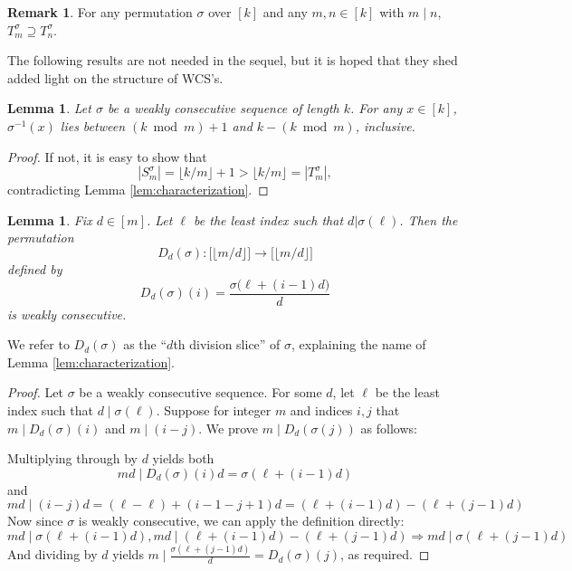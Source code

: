 \documentclass{article}
\newtheorem{lemma}[theorem]{Lemma}
\newtheorem{conjecture}[theorem]{Conjecture}
\theoremstyle{definition}
\newtheorem*{remark}{Remark}
\theoremstyle{remark}
\numberwithin{equation}{section}
\numberwithin{case}{theorem}
\begin{document}
\begin{remark} 
    For any permutation $\sigma$ over $[k]$ and any $m, n \in [k]$ with $m \mid n$, $T_m^\sigma \supseteq T_n^\sigma$.
\end{remark}

The following results are not needed in the sequel, but it is hoped that they shed added light on the structure of WCS's.

\begin{lemma}
    Let $\sigma$ be a weakly consecutive sequence of length $k$. For any $x \in [k]$, $\sigma^{-1}(x)$ lies between $(k \bmod m) + 1$ and $k - (k \bmod m)$, inclusive. %
\end{lemma}

\begin{proof}
If not, it is easy to show that
\[
  |S_m^\sigma| = \lfloor k/m \rfloor + 1 > \lfloor k/m \rfloor = |T_m^\sigma|,
\]
contradicting Lemma \ref{lem:characterization}.
\end{proof}


\begin{lemma} \label{lem:div_slice}
    Fix $d \in [m]$. Let $\ell$ be the least index such that $d | \sigma(\ell)$. Then the permutation
    \[
      D_d (\sigma) : \big[\lfloor m/d \rfloor\big] \to \big[\lfloor m/d \rfloor\big]
    \]
    defined by
    \[
      D_d(\sigma)(i) = \frac{\sigma\big(\ell + (i-1)d\big)}{d}
    \]
    is weakly consecutive.

\end{lemma}

We refer to $D_d(\sigma)$ as the ``$d$th division slice'' of $\sigma$, explaining the name of Lemma \ref{lem:characterization}.

\begin{proof} Let $\sigma$ be a weakly consecutive sequence. For some $d$, let $\ell$ be the least index such that $d\mid \sigma (\ell)$. Suppose for integer $m$ and indices $i,j$ that $m \mid D_d(\sigma)(i)$ and $m \mid (i-j)$. We prove $m \mid D_d(\sigma(j))$ as follows:

Multiplying through by $d$ yields both
$$md \mid D_d(\sigma)(i)d = \sigma(\ell + (i-1)d)$$
and
$$md \mid (i-j)d = (\ell - \ell) + (i - 1 - j + 1)d = (\ell + (i-1)d) - (\ell + (j-1)d)$$
Now since $\sigma$ is weakly consecutive, we can apply the definition directly:
$$md \mid \sigma(\ell + (i-1)d), md \mid (\ell + (i-1)d) - (\ell + (j-1)d) \Rightarrow md \mid \sigma(\ell + (j-1)d)$$
And dividing by $d$ yields $m \mid \frac{\sigma(\ell + (j-1)d)}{d} = D_d(\sigma)(j)$, as required.
\end{proof}
\end{document}
